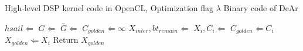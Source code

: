 \begin{algorithm}[h]
    \caption{}
    \begin{algorithmic}[1]
        \Require 
        High-level DSP kernel code in OpenCL, Optimization flag $\lambda$
        \Ensure 
        Binary code of DeAr

        \State $hsail \Leftarrow$ 
        \label{line:tohsail}
        \State $G \Leftarrow$ 
        \label{line:trans}
        \State $\bar{G} \Leftarrow$ 
        \label{line:trane}
        \State $C_{golden} \Leftarrow  \infty$
        \label{line:optstart}
        \label{line:forlambda}
        \State $X_{inter}, bt_{remain} \Leftarrow$ 
        \State $X_i, C_i \Leftarrow$ 
        \State $C_{golden} \Leftarrow C_i$
        \State $X_{golden} \Leftarrow X_i$
        \EndIf
        \EndFor
        \State Return $X_{golden}$
        \label{line:optend}
    \end{algorithmic}
    \label{alg:framework}
\end{algorithm}

